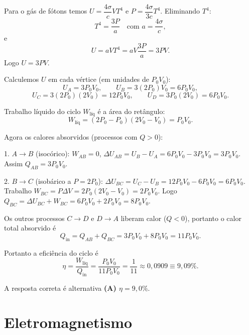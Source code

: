 \documentclass[a4paper,12pt]{article}
\begin{document}
\begin{flushleft}
Para o gás de fótons temos \(U=\dfrac{4\sigma}{c}VT^4\) e \(P=\dfrac{4\sigma}{3c}T^4\). Eliminando \(T^4\):
\[
T^4=\frac{3P}{a}\quad\text{com }a=\frac{4\sigma}{c},
\]
e
\[
U=aVT^4 = aV\frac{3P}{a}=3PV.
\]
Logo \(U=3PV\).

Calculemos \(U\) em cada vértice (em unidades de \(P_0V_0\)):
\[
U_A=3P_0V_0,\qquad U_B=3(2P_0)V_0=6P_0V_0,
\]
\[
U_C=3(2P_0)(2V_0)=12P_0V_0,\qquad U_D=3P_0(2V_0)=6P_0V_0.
\]

Trabalho líquido do ciclo \(W_{\text{líq}}\) é a área do retângulo:
\[
W_{\text{líq}}=(2P_0-P_0)(2V_0-V_0)=P_0V_0.
\]

Agora os calores absorvidos (processos com \(Q>0\)):

1. \(A\to B\) (isocórico): \(W_{AB}=0\), \(\Delta U_{AB}=U_B-U_A=6P_0V_0-3P_0V_0=3P_0V_0\). Assim \(Q_{AB}=3P_0V_0\).

2. \(B\to C\) (isobárico a \(P=2P_0\)): \(\Delta U_{BC}=U_C-U_B=12P_0V_0-6P_0V_0=6P_0V_0\). Trabalho \(W_{BC}=P\Delta V=2P_0(2V_0-V_0)=2P_0V_0\). Logo \(Q_{BC}=\Delta U_{BC}+W_{BC}=6P_0V_0+2P_0V_0=8P_0V_0\).

Os outros processos \(C\to D\) e \(D\to A\) liberam calor (\(Q<0\)), portanto o calor total absorvido é
\[
Q_{\text{in}}=Q_{AB}+Q_{BC}=3P_0V_0+8P_0V_0=11P_0V_0.
\]

Portanto a eficiência do ciclo é
\[
\eta=\frac{W_{\text{líq}}}{Q_{\text{in}}}=\frac{P_0V_0}{11P_0V_0}=\frac{1}{11}\approx 0{,}0909\equiv 9{,}09\%.
\]

A resposta correta é alternativa \colorbox{green!50}{\textbf{(A) \(\eta=9{,}0\%\)}}.

\end{flushleft}


\section{Eletromagnetismo}
\end{document}
